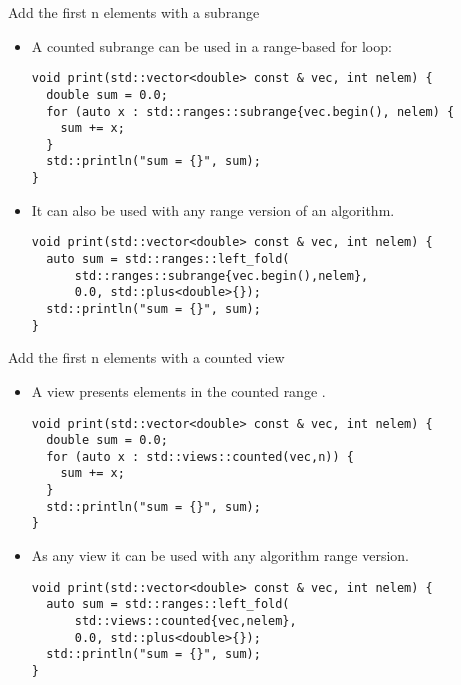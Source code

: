 \begin{frame}[t,fragile]{Add the first n elements with a subrange}
\begin{itemize}
  \item A counted subrange can be used in a range-based for loop:
\begin{lstlisting}
void print(std::vector<double> const & vec, int nelem) {
  double sum = 0.0;
  for (auto x : std::ranges::subrange{vec.begin(), nelem) {
    sum += x;
  }
  std::println("sum = {}", sum);
}

\end{lstlisting}

  \item It can also be used with any range version of an algorithm.
\begin{lstlisting}
void print(std::vector<double> const & vec, int nelem) {
  auto sum = std::ranges::left_fold(
      std::ranges::subrange{vec.begin(),nelem},
      0.0, std::plus<double>{});
  std::println("sum = {}", sum);
}
\end{lstlisting}
\end{itemize}
\end{frame}

\begin{frame}[t,fragile]{Add the first n elements with a counted view}
\begin{itemize}
  \item A  view presents elements in the counted range
        \textmark{[i, i+n)}.
\begin{lstlisting}
void print(std::vector<double> const & vec, int nelem) {
  double sum = 0.0;
  for (auto x : std::views::counted(vec,n)) {
    sum += x;
  }
  std::println("sum = {}", sum);
}
\end{lstlisting}

  \item As any view it can be used with any algorithm range version.
\begin{lstlisting}
void print(std::vector<double> const & vec, int nelem) {
  auto sum = std::ranges::left_fold(
      std::views::counted{vec,nelem},
      0.0, std::plus<double>{});
  std::println("sum = {}", sum);
}
\end{lstlisting}
\end{itemize}
\end{frame}
